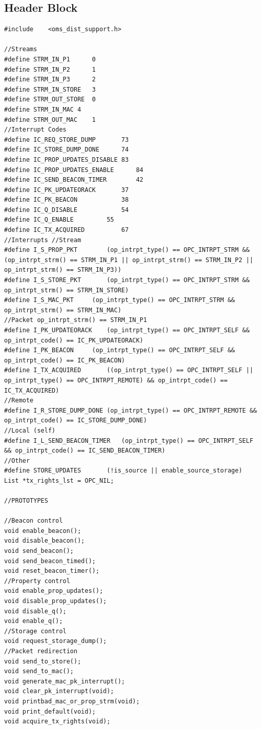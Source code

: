 \subsection{Header Block}
{\tiny
\begin{verbatim}
#include	<oms_dist_support.h>

//Streams
#define STRM_IN_P1		0
#define STRM_IN_P2		1
#define STRM_IN_P3		2
#define STRM_IN_STORE	3
#define STRM_OUT_STORE	0
#define STRM_IN_MAC	4
#define STRM_OUT_MAC 	1
//Interrupt Codes
#define IC_REQ_STORE_DUMP		73
#define IC_STORE_DUMP_DONE		74
#define IC_PROP_UPDATES_DISABLE	83
#define IC_PROP_UPDATES_ENABLE		84
#define IC_SEND_BEACON_TIMER		42
#define IC_PK_UPDATEORACK		37
#define IC_PK_BEACON			38
#define IC_Q_DISABLE			54
#define IC_Q_ENABLE			55
#define IC_TX_ACQUIRED			67
//Interrupts //Stream
#define I_S_PROP_PKT		(op_intrpt_type() == OPC_INTRPT_STRM && (op_intrpt_strm() == STRM_IN_P1 || op_intrpt_strm() == STRM_IN_P2 || op_intrpt_strm() == STRM_IN_P3))
#define I_S_STORE_PKT		(op_intrpt_type() == OPC_INTRPT_STRM && op_intrpt_strm() == STRM_IN_STORE)
#define I_S_MAC_PKT		(op_intrpt_type() == OPC_INTRPT_STRM && op_intrpt_strm() == STRM_IN_MAC)
//Packet op_intrpt_strm() == STRM_IN_P1
#define I_PK_UPDATEORACK	(op_intrpt_type() == OPC_INTRPT_SELF && op_intrpt_code() == IC_PK_UPDATEORACK)
#define I_PK_BEACON		(op_intrpt_type() == OPC_INTRPT_SELF && op_intrpt_code() == IC_PK_BEACON)
#define I_TX_ACQUIRED		((op_intrpt_type() == OPC_INTRPT_SELF || op_intrpt_type() == OPC_INTRPT_REMOTE) && op_intrpt_code() == IC_TX_ACQUIRED)
//Remote
#define I_R_STORE_DUMP_DONE	(op_intrpt_type() == OPC_INTRPT_REMOTE && op_intrpt_code() == IC_STORE_DUMP_DONE)
//Local (self)
#define I_L_SEND_BEACON_TIMER 	(op_intrpt_type() == OPC_INTRPT_SELF && op_intrpt_code() == IC_SEND_BEACON_TIMER)
//Other
#define STORE_UPDATES		(!is_source || enable_source_storage)
List *tx_rights_lst = OPC_NIL;
 
//PROTOTYPES
 
//Beacon control
void enable_beacon();
void disable_beacon();
void send_beacon();
void send_beacon_timed();
void reset_beacon_timer();
//Property control
void enable_prop_updates();
void disable_prop_updates();
void disable_q();
void enable_q();
//Storage control
void request_storage_dump();
//Packet redirection 
void send_to_store();
void send_to_mac();
void generate_mac_pk_interrupt();
void clear_pk_interrupt(void);
void printbad_mac_or_prop_strm(void);
void print_default(void);
void acquire_tx_rights(void);
\end{verbatim}
}

